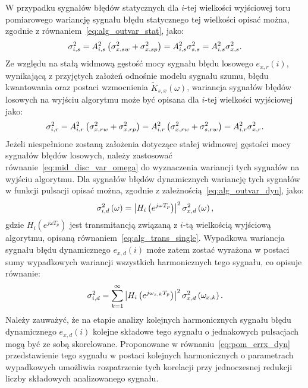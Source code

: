 W przypadku sygnałów błędów statycznych dla $i$-tej wielkości wyjściowej toru pomiarowego wariancję sygnału błędu statycznego tej wielkości opisać można, zgodnie z równaniem~\eqref{eq:alg_outvar_stat}, jako:
\begin{equation}
\sigma_{i,s}^{2} = A_{i,s}^{2} \left(\sigma_{x,sw}^{2} + \sigma_{x,sp}^{2}\right) = A_{i,s}^{2} \sigma_{s,s}^{2} = A_{i,s}^{2} \sigma_{x,s}^{2} \label{eq:pom_varout_stat}.
\end{equation}
Ze względu na stałą widmową gęstość mocy sygnału błędu losowego $e_{x,r}(i)$, wynikającą z przyjętych założeń odnośnie modelu sygnału szumu, błędu kwantowania oraz postaci wzmocnienia $\tilde{K}_{s,x}(\omega)$, wariancja sygnałów błędów losowych na wyjściu algorytmu może być opisana dla $i$-tej wielkości wyjściowej jako:
\begin{equation}
\sigma_{i,r}^{2} = A_{i,r}^{2} \left(\sigma_{x,rw}^{2} + \sigma_{x,rp}^{2}\right) = A_{i,r}^{2} \left(\sigma_{x,rw}^{2} + \sigma_{s,rw}^{2}\right) = A_{i,r}^{2} \sigma_{x,r}^{2} \label{eq:pom_varout_rand}.
\end{equation}
Jeżeli niespełnione zostaną założenia dotyczące stałej widmowej gęstości mocy sygnałów błędów losowych, należy zastosować równanie~\eqref{eq:mid_disc_var_omega} do wyznaczenia wariancji tych sygnałów na wyjściu algorytmu.
Dla sygnałów błędów dynamicznych wariancję tych sygnałów w funkcji pulsacji opisać można, zgodnie z zależnością~\eqref{eq:alg_outvar_dyn}, jako:
\begin{equation}
\sigma_{i,d}^{2} \left(\omega\right) = \left| H_{i} \left(e^{j \omega T_{p}}\right) \right|^{2} \sigma_{x,d}^{2} \left(\omega\right) \label{eq:pom_varout_dyn},
\end{equation}
gdzie $H_{i}(e^{j \omega T_{p}})$ jest transmitancją związaną z $i$-tą wielkością wyjściową algorytmu, opisaną równaniem~\eqref{eq:alg_trans_single}. Wypadkowa wariancja sygnału błędu dynamicznego $e_{x,d}(i)$ może zatem zostać wyrażona w postaci sumy wypadkowych wariancji wszystkich harmonicznych tego sygnału, co opisuje równanie:
\begin{equation}
\sigma_{i,d}^{2} = \sum _{k=1} ^{\infty} \left| H_{i} \left(e^{j \omega_{x,k} T_{p}}\right) \right|^{2} \sigma_{x,d}^{2} \left(\omega_{x,k}\right) \label{eq:pom_varout_dyn_sum}.
\end{equation}
Należy zauważyć, że na etapie analizy kolejnych harmonicznych sygnału błędu dynamicznego $e_{x,d}(i)$ kolejne składowe tego sygnału o jednakowych pulsacjach mogą być ze sobą skorelowane. Proponowane w równaniu~\eqref{eq:pom_errx_dyn} przedstawienie tego sygnału w postaci kolejnych harmonicznych o parametrach wypadkowych umożliwia rozpatrzenie tych korelacji przy jednoczesnej redukcji liczby składowych analizowanego sygnału.

